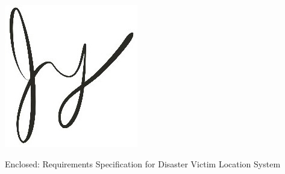 \documentclass[11pt]{letter}
\begin{document}
\begin{letter}
\vspace*{-0.25cm}
\includegraphics[scale=0.8]{./images/signature.jpg}

{Enclosed: Requirements Specification for Disaster Victim Location System}

\end{letter}
\end{document}
